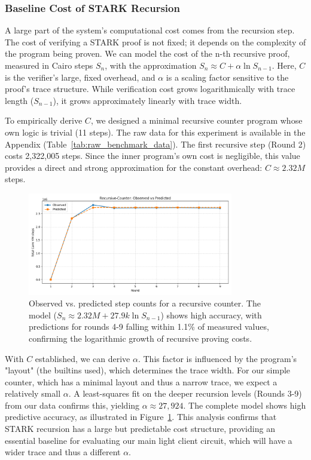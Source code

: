 \documentclass[runningheads]{llncs}
\begin{document}
\subsubsection{Baseline Cost of STARK Recursion}
A large part of the system's computational cost comes from the recursion step. The cost of verifying a STARK proof is not fixed; it depends on the complexity of the program being proven. We can model the cost of the n-th recursive proof, measured in Cairo steps \(S_n\), with the approximation \(S_n \approx C + \alpha \ln S_{n-1}\). Here, \(C\) is the verifier's large, fixed overhead, and \(\alpha\) is a scaling factor sensitive to the proof's trace structure. While verification cost grows logarithmically with trace length (\(S_{n-1}\)), it grows approximately linearly with trace width.

To empirically derive \(C\), we designed a minimal recursive counter program whose own logic is trivial (11 steps). The raw data for this experiment is available in the Appendix (Table~\ref{tab:raw_benchmark_data}). The first recursive step (Round 2) costs 2,322,005 steps. Since the inner program's own cost is negligible, this value provides a direct and strong approximation for the constant overhead: \(C \approx 2.32M\) steps.

\begin{figure}[H]
    \centering
    \includegraphics[width=0.8\textwidth]{diagrams/recursive_counter_observed_vs_predicted.png}
    \caption{Observed vs. predicted step counts for a recursive counter. The model (\(S_n \approx 2.32M + 27.9k \ln S_{n-1}\)) shows high accuracy, with predictions for rounds 4-9 falling within 1.1\% of measured values, confirming the logarithmic growth of recursive proving costs.}
    \label{fig:counter_prediction}
\end{figure}

With \(C\) established, we can derive \(\alpha\). This factor is influenced by the program's "layout" (the builtins used), which determines the trace width. For our simple counter, which has a minimal layout and thus a narrow trace, we expect a relatively small \(\alpha\). A least-squares fit on the deeper recursion levels (Rounds 3-9) from our data confirms this, yielding \(\alpha \approx 27,924\). The complete model shows high predictive accuracy, as illustrated in Figure~\ref{fig:counter_prediction}. This analysis confirms that STARK recursion has a large but predictable cost structure, providing an essential baseline for evaluating our main light client circuit, which will have a wider trace and thus a different \(\alpha\).
\end{document}
